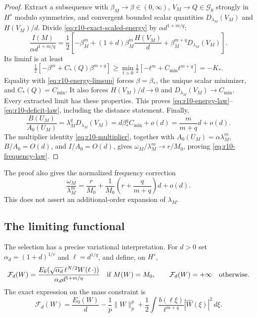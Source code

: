 \begin{proof}
Extract a subsequence with $\beta_M\to\beta\in(0,\infty)$,
$V_M\to Q\in\mathcal G_0$ strongly in $H^s$ modulo symmetries, and
convergent bounded scalar quantities $D_{\lambda_M}(V_M)$ and
$H(V_M)/d$. Divide \eqref{eq:r10-exact-scaled-energy} by
$\alpha d^{1+m/q}$:
\begin{equation}\label{eq:r10-final-scaled-energy}
 \frac{I(M)}{\alpha d^{1+m/q}}
 =\frac12\left[-\beta_M^m
 +(1+d)\beta_M^m\frac{H(V_M)}d
 +\beta_M^{m+q}D_{\lambda_M}(V_M)\right].
\end{equation}
Its liminf is at least
\[
 \tfrac12[-\beta^m+C_*(Q)\beta^{m+q}]
 \ge\min_{t>0}\tfrac12[-t^m+C_{\min}t^{m+q}]=-K_*.
\]
Equality with \eqref{eq:r10-energy-limsup} forces
$\beta=\beta_*$, the unique scalar minimizer, and
$C_*(Q)=C_{\min}$. It also forces
$H(V_M)/d\to0$ and $D_{\lambda_M}(V_M)\to C_{\min}$.
Every extracted limit has these properties. This proves
\eqref{eq:r10-energy-law}--\eqref{eq:r10-deficit-law}, including the
distance statement. Finally,
\[
 \frac{B(U_M)}{A_0(U_M)}
 =\lambda_M^qD_{\lambda_M}(V_M)
 =d\beta_*^qC_{\min}+o(d)=\frac{m}{m+q}d+o(d).
\]
The multiplier identity \eqref{eq:r10-multiplier}, together with
$A_0(U_M)=\alpha\lambda_M^m$, $B/A_0=O(d)$, and $I/A_0=O(d)$, gives
$\omega_M/\lambda_M^m\to r/M_0$, proving
\eqref{eq:r10-frequency-law}.
\end{proof}

The proof also gives the normalized frequency correction
\[
 \frac{\omega_M}{\lambda_M^m}
 =\frac r{M_0}+\frac1{M_0}\left(r+\frac q{m+q}\right)d+o(d).
\]
This does not assert an additional-order expansion of $\lambda_M$.

\subsection{The limiting functional}

The selection has a precise variational interpretation. For $d>0$ set
$\alpha_d=(1+d)^{1/r}$ and $\ell=d^{1/q}$, and define, on $H^s$,
\[
 \mathcal F_d(W)=
 \frac{E_k(\sqrt{\alpha_d}\,\ell^{N/2}W(\ell\,\cdot))}
      {\alpha_d d^{1+m/q}}
 \quad\hbox{if }M(W)=M_0,
 \qquad \mathcal F_d(W)=+\infty\quad\hbox{otherwise}.
\]
The exact expression on the mass constraint is
\begin{equation}\label{eq:r10-gamma-exact}
 \mathcal F_d(W)=\frac{E_0(W)}d-\frac1p\|W\|_p^p
       +\frac12\int\frac{b(\ell\xi)}{\ell^{m+q}}
                                 |\widehat W(\xi)|^2\,d\xi.
\end{equation}

